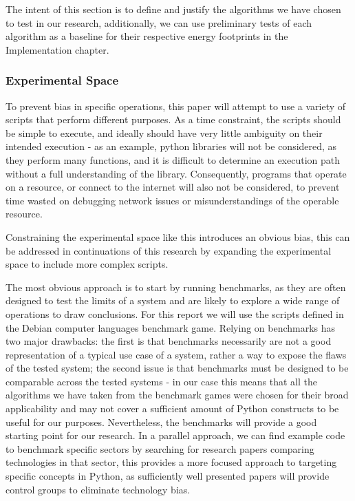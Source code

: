 The intent of this section is to define and justify the algorithms we have chosen to test in our research, additionally,
we can use preliminary tests of each algorithm as a baseline for their respective energy footprints in the Implementation
chapter.

\subsubsection{Experimental Space}
To prevent bias in specific operations, this paper will attempt to use a variety of scripts that perform different
purposes.
As a time constraint, the scripts should be simple to execute, and ideally should have very little ambiguity on their
intended execution - as an example, python libraries will not be considered, as they perform many functions, and it is
difficult to determine an execution path without a full understanding of the library.
Consequently, programs that operate on a resource, or connect to the internet will also not be considered, to prevent
time wasted on debugging network issues or misunderstandings of the operable resource.

Constraining the experimental space like this introduces an obvious bias, this can be addressed in continuations of this
research by expanding the experimental space to include more complex scripts.

The most obvious approach is to start by running benchmarks, as they are often designed to test the limits of a system
and are likely to explore a wide range of operations to draw conclusions.
For this report we will use the scripts defined in the Debian computer languages benchmark game\cite{BenchmarkGame}.
Relying on benchmarks has two major drawbacks: the first is that benchmarks necessarily are not a good representation
of a typical use case of a system, rather a way to expose the flaws of the tested system; the second issue is that
benchmarks must be designed to be comparable across the tested systems - in our case this means that all the algorithms
we have taken from the benchmark games were chosen for their broad applicability and may not cover a sufficient amount
of Python constructs to be useful for our purposes.
Nevertheless, the benchmarks will provide a good starting point for our research.
In a parallel approach, we can find example code to benchmark specific sectors by searching for research papers
comparing technologies in that sector, this provides a more focused approach to targeting specific concepts in Python,
as sufficiently well presented papers will provide control groups to eliminate technology bias.

